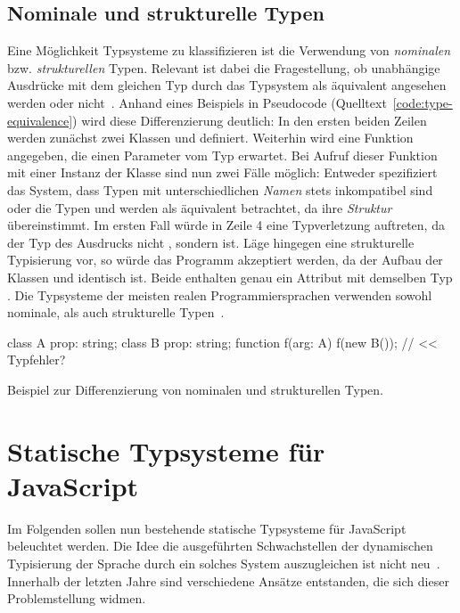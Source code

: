 \subsection{Nominale und strukturelle Typen}
Eine Möglichkeit Typsysteme zu klassifizieren ist die Verwendung von \emph{nominalen} bzw. \emph{strukturellen} Typen. Relevant ist dabei die Fragestellung, ob unabhängige Ausdrücke mit dem gleichen Typ durch das Typsystem als äquivalent angesehen werden oder nicht~\autocite[9]{CARDELLI:TYPE_SYSTEMS}. Anhand eines Beispiels in Pseudocode (Quelltext~\ref{code:type-equivalence}) wird diese Differenzierung deutlich: In den ersten beiden Zeilen werden zunächst zwei Klassen  und  definiert. Weiterhin wird eine Funktion  angegeben, die einen Parameter vom Typ  erwartet. Bei Aufruf dieser Funktion mit einer Instanz der Klasse  sind nun zwei Fälle möglich: Entweder spezifiziert das System, dass Typen mit unterschiedlichen \emph{Namen} stets inkompatibel sind oder die Typen  und  werden als äquivalent betrachtet, da ihre \emph{Struktur} übereinstimmt. Im ersten Fall würde in Zeile 4 eine Typverletzung auftreten, da der Typ des Ausdrucks  nicht , sondern  ist. Läge hingegen eine strukturelle Typisierung vor, so würde das Programm akzeptiert werden, da der Aufbau der Klassen  und  identisch ist. Beide enthalten genau ein Attribut  mit demselben Typ . Die Typsysteme der meisten realen Programmiersprachen verwenden sowohl nominale, als auch strukturelle Typen~\autocite[9]{CARDELLI:TYPE_SYSTEMS}.

\bigbreak
\begin{listing}[htb]
\begin{textcode}
class A { prop: string; }
class B { prop: string; }
function f(arg: A) {}
f(new B()); // << Typfehler?
\end{textcode}
\listingvspace
\caption{Beispiel zur Differenzierung von nominalen und strukturellen Typen.}
\label{code:type-equivalence}
\end{listing}




\section{Statische Typsysteme für JavaScript}
\label{sec:static-typesystems-for-js}

Im Folgenden sollen nun bestehende statische Typsysteme für JavaScript beleuchtet werden. Die Idee die ausgeführten Schwachstellen der dynamischen Typisierung der Sprache durch ein solches System auszugleichen ist nicht neu~\autocite[2]{FLOW:PAPER}. Innerhalb der letzten Jahre sind verschiedene Ansätze entstanden, die sich dieser Problemstellung widmen.

